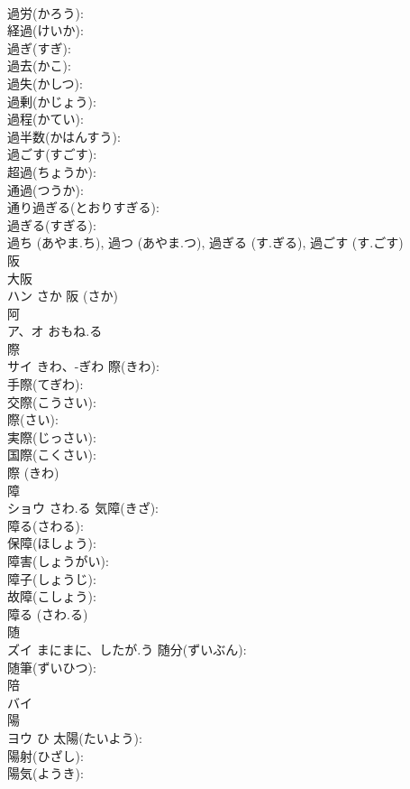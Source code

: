 \documentclass[8pt]{extreport}
\begin{document}
\begin{CJK}{UTF8}{min}
\\	過労(かろう): 
\\	経過(けいか): 
\\	過ぎ(すぎ): 
\\	過去(かこ): 
\\	過失(かしつ): 
\\	過剰(かじょう): 
\\	過程(かてい): 
\\	過半数(かはんすう): 
\\	過ごす(すごす): 
\\	超過(ちょうか): 
\\	通過(つうか): 
\\	通り過ぎる(とおりすぎる): 
\\	過ぎる(すぎる): 
\\	過ち (あやま.ち), 過つ (あやま.つ), 過ぎる (す.ぎる), 過ごす (す.ごす)
\\	阪			
\\	大阪 
\\	ハン	さか		阪 (さか)
\\	阿			
\\	ア、オ	おもね.る		
\\	際			
\\	サイ	きわ、-ぎわ	際(きわ): 
\\	手際(てぎわ): 
\\	交際(こうさい): 
\\	際(さい): 
\\	実際(じっさい): 
\\	国際(こくさい): 
\\	際 (きわ)
\\	障			
\\	ショウ	さわ.る	気障(きざ): 
\\	障る(さわる): 
\\	保障(ほしょう): 
\\	障害(しょうがい): 
\\	障子(しょうじ): 
\\	故障(こしょう): 
\\	障る (さわ.る)
\\	随			
\\	ズイ	まにまに、したが.う	随分(ずいぶん): 
\\	随筆(ずいひつ): 
\\	陪			
\\	バイ			
\\	陽			
\\	ヨウ	ひ	太陽(たいよう): 
\\	陽射(ひざし): 
\\	陽気(ようき): 

\end{CJK}
\end{document}
